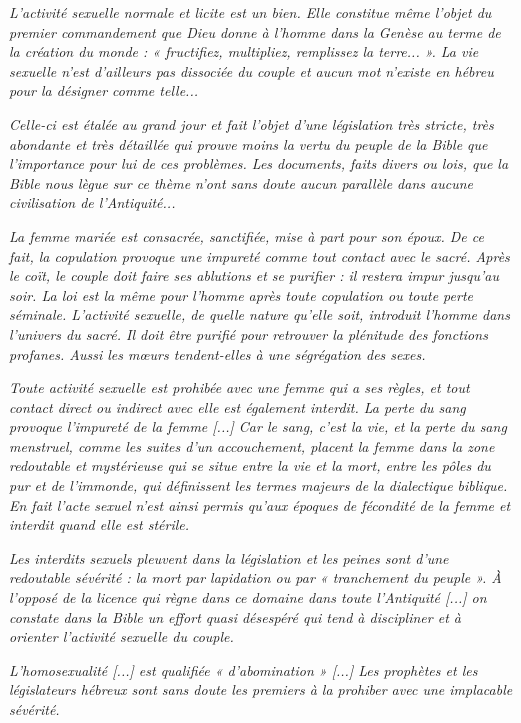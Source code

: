\begin{displayquote}
{%
\emph{L'activité sexuelle normale et licite est un bien. Elle constitue même l'objet du premier commandement que Dieu donne à l'homme dans la Genèse au terme de la création du monde : « fructifiez, multipliez, remplissez la terre... ». La vie sexuelle n'est d'ailleurs pas dissociée du couple et aucun mot n'existe en hébreu pour la désigner comme telle...}

 \emph{Celle-ci est étalée au grand jour et fait l'objet d'une législation très stricte, très abondante et très détaillée qui prouve moins la vertu du peuple de la Bible que l'importance pour lui de ces problèmes. Les documents, faits divers ou lois, que la Bible nous lègue sur ce thème n'ont sans doute aucun parallèle dans aucune civilisation de l'Antiquité...}

 \emph{La femme mariée est consacrée, sanctifiée, mise à part pour son époux. De ce fait, la copulation provoque une impureté comme tout contact avec le sacré. Après le coït, le couple doit faire ses ablutions et se purifier : il restera impur jusqu'au soir. La loi est la même pour l'homme après toute copulation ou toute perte séminale. L'activité sexuelle, de quelle nature qu'elle soit, introduit l'homme dans l'univers du sacré. Il doit être purifié pour retrouver la plénitude des fonctions profanes. Aussi les mœurs tendent-elles à une ségrégation des sexes.}

 \emph{Toute activité sexuelle est prohibée avec une femme qui a ses règles, et tout contact direct ou indirect avec elle est également interdit. La perte du sang provoque l'impureté de la femme \emph{[...]} Car le sang, c'est la vie, et la perte du sang menstruel, comme les suites d'un accouchement, placent la femme dans la zone redoutable et mystérieuse qui se situe entre la vie et la mort, entre les pôles du pur et de l'immonde, qui définissent les termes majeurs de la dialectique biblique. En fait l'acte sexuel n'est ainsi permis qu'aux époques de fécondité de la femme et interdit quand elle est stérile.}

 \emph{Les interdits sexuels pleuvent dans la législation et les peines sont d'une redoutable sévérité : la mort par lapidation ou par « tranchement du peuple ». À l'opposé de la licence qui règne dans ce domaine dans toute l'Antiquité \emph{[...]} on constate dans la Bible un effort quasi désespéré qui tend à discipliner et à orienter l'activité sexuelle du couple.}

 \emph{L'homosexualité \emph{[...]} est qualifiée « d'abomination » \emph{[...]} Les prophètes et les législateurs hébreux sont sans doute les premiers à la prohiber avec une implacable sévérité.}

}
\end{displayquote}
